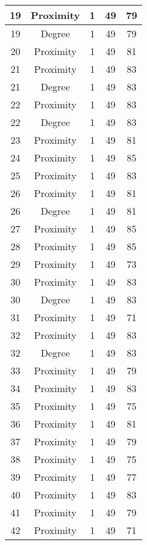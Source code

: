 \documentclass[results.tex]{subfiles}
\begin{document}
\begin{center}
\begin{tabular}{| c || c | c | c | c |}
    19 & Proximity & 1 & 49 & 79 \\ 
    \hline
    19 & Degree & 1 & 49 & 79 \\ 
    \hline
    20 & Proximity & 1 & 49 & 81 \\ 
    \hline
    21 & Proximity & 1 & 49 & 83 \\ 
    \hline
    21 & Degree & 1 & 49 & 83 \\ 
    \hline
    22 & Proximity & 1 & 49 & 83 \\ 
    \hline
    22 & Degree & 1 & 49 & 83 \\ 
    \hline
    23 & Proximity & 1 & 49 & 81 \\ 
    \hline
    24 & Proximity & 1 & 49 & 85 \\ 
    \hline
    25 & Proximity & 1 & 49 & 83 \\ 
    \hline
    26 & Proximity & 1 & 49 & 81 \\ 
    \hline
    26 & Degree & 1 & 49 & 81 \\ 
    \hline
    27 & Proximity & 1 & 49 & 85 \\ 
    \hline
    28 & Proximity & 1 & 49 & 85 \\ 
    \hline
    29 & Proximity & 1 & 49 & 73 \\ 
    \hline
    30 & Proximity & 1 & 49 & 83 \\ 
    \hline
    30 & Degree & 1 & 49 & 83 \\ 
    \hline
    31 & Proximity & 1 & 49 & 71 \\ 
    \hline
    32 & Proximity & 1 & 49 & 83 \\ 
    \hline
    32 & Degree & 1 & 49 & 83 \\ 
    \hline
    33 & Proximity & 1 & 49 & 79 \\ 
    \hline
    34 & Proximity & 1 & 49 & 83 \\ 
    \hline
    35 & Proximity & 1 & 49 & 75 \\ 
    \hline
    36 & Proximity & 1 & 49 & 81 \\ 
    \hline
    37 & Proximity & 1 & 49 & 79 \\ 
    \hline
    38 & Proximity & 1 & 49 & 75 \\ 
    \hline
    39 & Proximity & 1 & 49 & 77 \\ 
    \hline
    40 & Proximity & 1 & 49 & 83 \\ 
    \hline
    41 & Proximity & 1 & 49 & 79 \\ 
    \hline
    42 & Proximity & 1 & 49 & 71 \\ 

\end{tabular}
\end{center}
\end{document}
